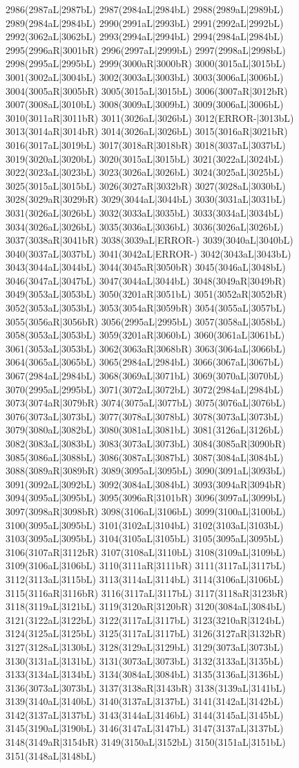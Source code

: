2986(2987aL|2987bL) 2987(2984aL|2984bL) 2988(2989aL|2989bL) 2989(2984aL|2984bL) 2990(2991aL|2993bL) 2991(2992aL|2992bL) 2992(3062aL|3062bL) 2993(2994aL|2994bL) 2994(2984aL|2984bL) 2995(2996aR|3001bR) 2996(2997aL|2999bL) 2997(2998aL|2998bL) 2998(2995aL|2995bL) 2999(3000aR|3000bR) 3000(3015aL|3015bL) 3001(3002aL|3004bL) 3002(3003aL|3003bL) 3003(3006aL|3006bL) 3004(3005aR|3005bR) 3005(3015aL|3015bL) 3006(3007aR|3012bR) 3007(3008aL|3010bL) 3008(3009aL|3009bL) 3009(3006aL|3006bL) 3010(3011aR|3011bR) 3011(3026aL|3026bL) 3012(ERROR-|3013bL) 3013(3014aR|3014bR) 3014(3026aL|3026bL) 3015(3016aR|3021bR) 3016(3017aL|3019bL) 3017(3018aR|3018bR) 3018(3037aL|3037bL) 3019(3020aL|3020bL) 3020(3015aL|3015bL) 3021(3022aL|3024bL) 3022(3023aL|3023bL) 3023(3026aL|3026bL) 3024(3025aL|3025bL) 3025(3015aL|3015bL) 3026(3027aR|3032bR) 3027(3028aL|3030bL) 3028(3029aR|3029bR) 3029(3044aL|3044bL) 3030(3031aL|3031bL) 3031(3026aL|3026bL) 3032(3033aL|3035bL) 3033(3034aL|3034bL) 3034(3026aL|3026bL) 3035(3036aL|3036bL) 3036(3026aL|3026bL) 3037(3038aR|3041bR) 3038(3039aL|ERROR-) 3039(3040aL|3040bL) 3040(3037aL|3037bL) 3041(3042aL|ERROR-) 3042(3043aL|3043bL) 3043(3044aL|3044bL) 3044(3045aR|3050bR) 3045(3046aL|3048bL) 3046(3047aL|3047bL) 3047(3044aL|3044bL) 3048(3049aR|3049bR) 3049(3053aL|3053bL) 3050(3201aR|3051bL) 3051(3052aR|3052bR) 3052(3053aL|3053bL) 3053(3054aR|3059bR) 3054(3055aL|3057bL) 3055(3056aR|3056bR) 3056(2995aL|2995bL) 3057(3058aL|3058bL) 3058(3053aL|3053bL) 3059(3201aR|3060bL) 3060(3061aL|3061bL) 3061(3053aL|3053bL) 3062(3063aR|3068bR) 3063(3064aL|3066bL) 3064(3065aL|3065bL) 3065(2984aL|2984bL) 3066(3067aL|3067bL) 3067(2984aL|2984bL) 3068(3069aL|3071bL) 3069(3070aL|3070bL) 3070(2995aL|2995bL) 3071(3072aL|3072bL) 3072(2984aL|2984bL) 3073(3074aR|3079bR) 3074(3075aL|3077bL) 3075(3076aL|3076bL) 3076(3073aL|3073bL) 3077(3078aL|3078bL) 3078(3073aL|3073bL) 3079(3080aL|3082bL) 3080(3081aL|3081bL) 3081(3126aL|3126bL) 3082(3083aL|3083bL) 3083(3073aL|3073bL) 3084(3085aR|3090bR) 3085(3086aL|3088bL) 3086(3087aL|3087bL) 3087(3084aL|3084bL) 3088(3089aR|3089bR) 3089(3095aL|3095bL) 3090(3091aL|3093bL) 3091(3092aL|3092bL) 3092(3084aL|3084bL) 3093(3094aR|3094bR) 3094(3095aL|3095bL) 3095(3096aR|3101bR) 3096(3097aL|3099bL) 3097(3098aR|3098bR) 3098(3106aL|3106bL) 3099(3100aL|3100bL) 3100(3095aL|3095bL) 3101(3102aL|3104bL) 3102(3103aL|3103bL) 3103(3095aL|3095bL) 3104(3105aL|3105bL) 3105(3095aL|3095bL) 3106(3107aR|3112bR) 3107(3108aL|3110bL) 3108(3109aL|3109bL) 3109(3106aL|3106bL) 3110(3111aR|3111bR) 3111(3117aL|3117bL) 3112(3113aL|3115bL) 3113(3114aL|3114bL) 3114(3106aL|3106bL) 3115(3116aR|3116bR) 3116(3117aL|3117bL) 3117(3118aR|3123bR) 3118(3119aL|3121bL) 3119(3120aR|3120bR) 3120(3084aL|3084bL) 3121(3122aL|3122bL) 3122(3117aL|3117bL) 3123(3210aR|3124bL) 3124(3125aL|3125bL) 3125(3117aL|3117bL) 3126(3127aR|3132bR) 3127(3128aL|3130bL) 3128(3129aL|3129bL) 3129(3073aL|3073bL) 3130(3131aL|3131bL) 3131(3073aL|3073bL) 3132(3133aL|3135bL) 3133(3134aL|3134bL) 3134(3084aL|3084bL) 3135(3136aL|3136bL) 3136(3073aL|3073bL) 3137(3138aR|3143bR) 3138(3139aL|3141bL) 3139(3140aL|3140bL) 3140(3137aL|3137bL) 3141(3142aL|3142bL) 3142(3137aL|3137bL) 3143(3144aL|3146bL) 3144(3145aL|3145bL) 3145(3190aL|3190bL) 3146(3147aL|3147bL) 3147(3137aL|3137bL) 3148(3149aR|3154bR) 3149(3150aL|3152bL) 3150(3151aL|3151bL) 3151(3148aL|3148bL) 